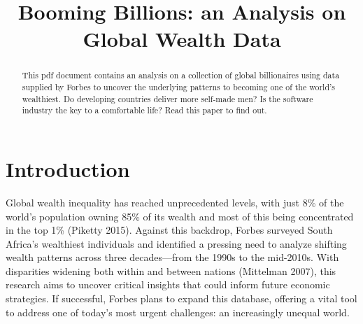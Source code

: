 \documentclass[preprint]{elsarticle}
\numberwithin{equation}{section}
\numberwithin{figure}{section}
\numberwithin{table}{section}
\begin{document}
\begin{frontmatter}  %

\title{Booming Billions: an Analysis on Global Wealth Data}


\begin{abstract}
\small{
This pdf document contains an analysis on a collection of global
billionaires using data supplied by Forbes to uncover the underlying
patterns to becoming one of the world's wealthiest. Do developing
countries deliver more self-made men? Is the software industry the key
to a comfortable life? Read this paper to find out.
}
\end{abstract}

\vspace{1cm}





\vspace{0.5cm}

\end{frontmatter}

\setcounter{footnote}{0}



\pagestyle{fancy}
\chead{}
\rhead{}
\lfoot{}
\rfoot{}
\lhead{}
\cfoot{}


\headsep 35pt %




\section{Introduction}\label{introduction}

Global wealth inequality has reached unprecedented levels, with just 8\%
of the world's population owning 85\% of its wealth and most of this
being concentrated in the top 1\% (Piketty 2015). Against this backdrop,
Forbes surveyed South Africa's wealthiest individuals and identified a
pressing need to analyze shifting wealth patterns across three
decades---from the 1990s to the mid-2010s. With disparities widening
both within and between nations (Mittelman 2007), this research aims to
uncover critical insights that could inform future economic strategies.
If successful, Forbes plans to expand this database, offering a vital
tool to address one of today's most urgent challenges: an increasingly
unequal world.
\end{document}
